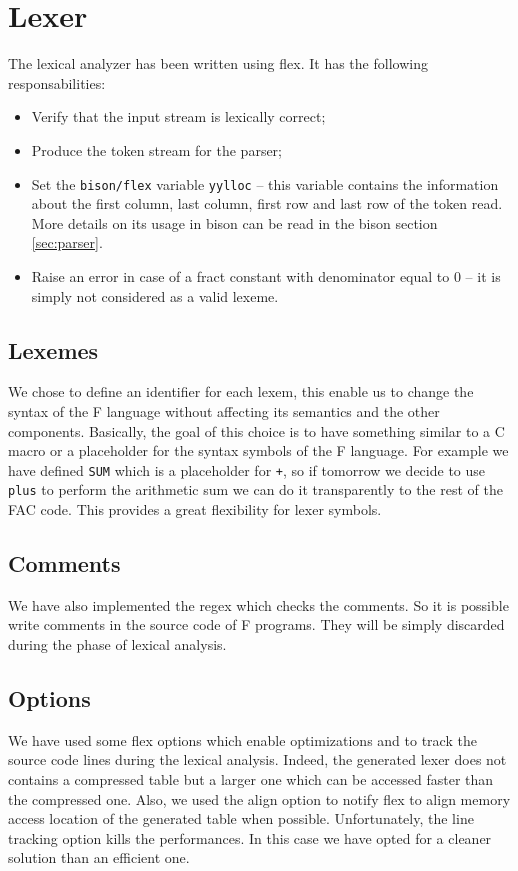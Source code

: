 \section{Lexer}
The lexical analyzer has been written using flex.
It has the following responsabilities:
\begin{itemize}
\item Verify that the input stream is lexically correct;
\item Produce the token stream for the parser;
\item Set the \verb|bison/flex| variable \verb|yylloc| -- this
variable contains the information about the first column, last column,
first row and last row of the token read. More details on its usage in
bison can be read in the bison section \ref{sec:parser}.
\item Raise an error in case of a fract constant with denominator equal
to $0$ -- it is simply not considered as a valid lexeme.
\end{itemize}

\subsection{Lexemes}
We chose to define an identifier for each lexem, this enable us to change the
syntax of the F language without affecting its semantics and the other
components. Basically, the goal of this choice is to have something similar to
a C macro or a placeholder for the syntax symbols of the F language.
For example we have defined \verb|SUM| which is a placeholder for \verb|+|, so
if tomorrow we decide to use \verb|plus| to perform the arithmetic sum we can do
it transparently to the rest of the FAC code. This provides a great flexibility
for lexer symbols.

\subsection{Comments}
We have also implemented the regex which checks the comments. So it is possible
write comments in the source code of F programs. They will be simply discarded
during the phase of lexical analysis.

\subsection{Options}
We have used some flex options which enable optimizations
and to track the source code lines during the lexical analysis. Indeed, the
generated lexer does not contains a compressed table but a larger one which can
be accessed faster than the compressed one. Also, we used the align option to
notify flex to align memory access location of the generated table when
possible. Unfortunately, the line tracking option kills the performances.
In this case we have opted for a cleaner solution than an efficient one.

